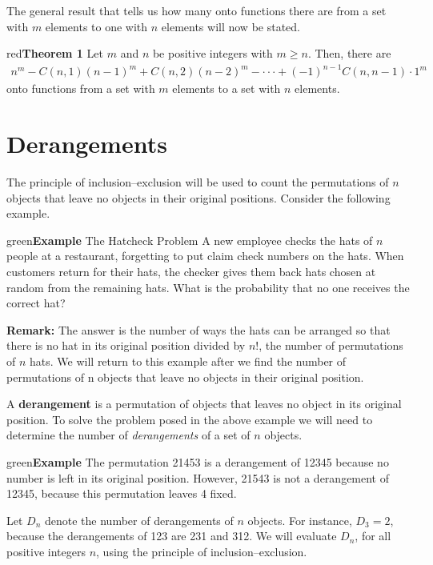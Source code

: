 \documentclass[11pt]{article}
\newenvironment{example}[1][\unskip]{\begin{mybox}{green}{\textbf{Example} {#1}}}{\end{mybox}}
\newenvironment{theorem}[1]{\begin{mybox}{red}{\textbf{Theorem #1}}}{\end{mybox}}
\begin{document}
\newpage
The general result that tells us how many onto functions there are from a set with $m$ elements to one with $n$ elements will now be stated.

\begin{theorem}
{1}
Let $m$ and $n$ be positive integers with $m \geq n$. Then, there are
\begin{align*}
    n^m - C(n, 1)(n - 1)^m + C(n, 2)(n - 2)^m - \cdot \cdot \cdot + (-1)^{n-1}C(n, n - 1) \cdot 1^m
\end{align*}
onto functions from a set with $m$ elements to a set with $n$ elements.
\end{theorem}

\section{Derangements}

The principle of inclusion–exclusion will be used to count the permutations of $n$ objects that leave no objects in their original positions. Consider the following example.

\begin{example}[The Hatcheck Problem]
A new employee checks the hats of $n$ people at a restaurant, forgetting to put claim check numbers on the hats. When customers return for their hats, the checker gives them back hats chosen at random from the remaining hats. What is the probability that no one receives the correct hat?
\end{example}

\textbf{Remark:} The answer is the number of ways the hats can be arranged so that there is no hat in its original position divided by $n!$, the number of permutations of $n$ hats. We will return to this example after we find the number of permutations of n objects that leave no objects in their original position.

A \textbf{derangement} is a permutation of objects that leaves no object in its original position. To solve the problem posed in the above example we will need to determine the number of \textit{derangements} of a set of $n$ objects.

\begin{example}
The permutation 21453 is a derangement of 12345 because no number is left in its original position. However, 21543 is not a derangement of 12345, because this permutation leaves 4 fixed.
\end{example}

Let $D_n$ denote the number of derangements of $n$ objects. For instance, $D_3 = 2$, because the derangements of 123 are 231 and 312. We will evaluate $D_n$, for all positive integers $n$, using the principle of inclusion–exclusion.
\end{document}
